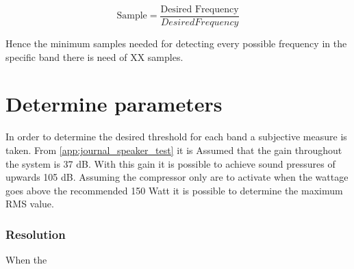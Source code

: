 \begin{equation}\label{eq:Minsample}
\text{Sample}= \frac{\text{Desired Frequency}}{Desired Frequency}
\end{equation} 

Hence the minimum samples needed for detecting every possible frequency in the specific band there is need of XX samples.

\section{Determine parameters}
In order to determine the desired threshold for each band a subjective measure is taken.
From \autoref{app:journal_speaker_test} it is Assumed that the gain throughout the system is 37 dB. With this gain it is possible to achieve sound pressures of upwards 105 dB. Assuming the compressor only are to activate when the wattage goes above the recommended 150 Watt it is possible to determine the maximum RMS value. 

\subsubsection*{Resolution}
When the 








